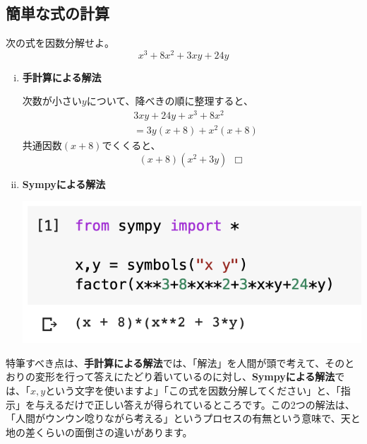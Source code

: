 \documentclass[12pt, a5paper]{bxjsbook}
\begin{document}
\subsection{簡単な式の計算}
\begin{framed}
\begin{exq}
次の式を因数分解せよ。
$$x^3+8x^2+3xy+24y$$
\end{exq}
\end{framed}
\begin{enumerate}[(i)]
    \item 
    {\bf 手計算による解法}
    
    次数が小さい$y$について、降べきの順に整理すると、
    \begin{align*}
        &3xy+24y+x^3+8x^2\\
        &= 3y(x+8)+x^2(x+8)
    \end{align*}
    共通因数$(x+8)$でくくると、
    $$(x+8)(x^2+3y)\ \ \Box$$
    \item
    
    {\bf Sympyによる解法}
    \begin{center}
    \includegraphics[scale=0.5]{fig1-2-1.png}
    \end{center}
\end{enumerate}
特筆すべき点は、{\bf 手計算による解法}では、「解法」を人間が頭で考えて、そのとおりの変形を行って答えにたどり着いているのに対し、{\bf Sympyによる解法}では、「$x,y$という文字を使いますよ」「この式を因数分解してください」と、「指示」を与えるだけで正しい答えが得られているところです。この2つの解法は、「人間がウンウン唸りながら考える」というプロセスの有無という意味で、天と地の差くらいの面倒さの違いがあります。
\end{document}

